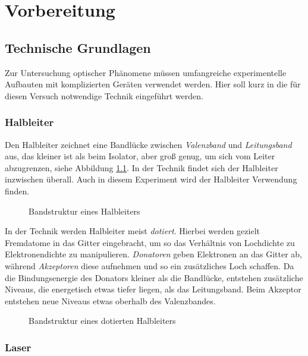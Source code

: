 \chapter{Vorbereitung}

\section{Technische Grundlagen}

Zur Untersuchung optischer Phänomene müssen umfangreiche experimentelle Aufbauten
mit komplizierten Geräten verwendet werden. Hier soll kurz in die für diesen
Versuch notwendige Technik eingeführt werden.


    \subsection{Halbleiter}

Den Halbleiter zeichnet eine Bandlücke zwischen \emph{Valenzband} und 
\emph{Leitungsband} aus, das kleiner ist als beim Isolator, aber groß genug,
um sich vom Leiter abzugrenzen, siehe Abbildung \ref{abb:band-halbleiter}.
In der Technik findet sich der Halbleiter inzwischen überall.
Auch in diesem Experiment wird der Halbleiter Verwendung finden.
\begin{figure}[h]
  \centering
  
  \caption{Bandstruktur eines Halbleiters}
  \label{abb:band-halbleiter}
\end{figure}
In der Technik werden Halbleiter meist \emph{dotiert}. Hierbei werden gezielt 
Fremdatome in das Gitter eingebracht, um so das Verhältnis von Lochdichte zu
Elektronendichte zu manipulieren. \emph{Donatoren} geben Elektronen an das Gitter 
ab, während \emph{Akzeptoren} diese aufnehmen und so ein zusätzliches Loch 
schaffen. Da die Bindungsenergie des Donators kleiner als die Bandlücke, entstehen
zusätzliche Niveaus, die energetisch etwas tiefer liegen, als das Leitungsband.
Beim Akzeptor entstehen neue Niveaus etwas oberhalb des Valenzbandes.
\begin{figure}[h]
  \centering
  
  \caption{Bandstruktur eines dotierten Halbleiters}
  \label{abb:band-dotiert}
\end{figure}


    \subsection{Laser}

